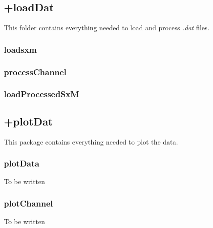 \subsection{+loadDat}
This folder contains everything needed to load and process \emph{.dat} files.
\subsubsection{loadsxm}

\subsubsection{processChannel}

\subsubsection{loadProcessedSxM}

\subsection{+plotDat}
This package contains everything needed to plot the data.
\subsubsection{plotData}
To be written
%
%
\subsubsection{plotChannel}
To be written
%
%
